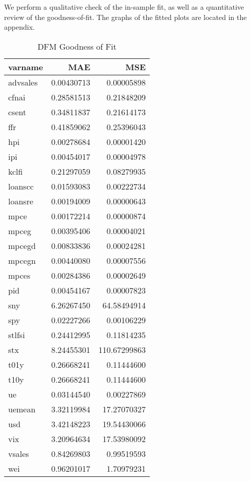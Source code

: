 \documentclass[11pt, letterpaper]{article}\usepackage[]{graphicx}\usepackage[]{color}
\begin{document}
We perform a qualitative check of the in-sample fit, as well as a quantitative review of the goodness-of-fit. The graphs of the fitted plots are located in the appendix.
\begin{table}[H]
\centering
\begingroup\footnotesize
\begin{tabular}{lrr}
  \hline
varname & MAE & MSE \\ 
  \hline
advsales & 0.00430713 & 0.00005898 \\ 
  cfnai & 0.28581513 & 0.21848209 \\ 
  csent & 0.34811837 & 0.21614173 \\ 
  ffr & 0.41859062 & 0.25396043 \\ 
  hpi & 0.00278684 & 0.00001420 \\ 
  ipi & 0.00454017 & 0.00004978 \\ 
  kclfi & 0.21297059 & 0.08279935 \\ 
  loanscc & 0.01593083 & 0.00222734 \\ 
  loansre & 0.00194009 & 0.00000643 \\ 
  mpce & 0.00172214 & 0.00000874 \\ 
  mpceg & 0.00395406 & 0.00004021 \\ 
  mpcegd & 0.00833836 & 0.00024281 \\ 
  mpcegn & 0.00440080 & 0.00007556 \\ 
  mpces & 0.00284386 & 0.00002649 \\ 
  pid & 0.00454167 & 0.00007823 \\ 
  sny & 6.26267450 & 64.58494914 \\ 
  spy & 0.02227266 & 0.00106229 \\ 
  stlfsi & 0.24412995 & 0.11814235 \\ 
  stx & 8.24455301 & 110.67299863 \\ 
  t01y & 0.26668241 & 0.11444600 \\ 
  t10y & 0.26668241 & 0.11444600 \\ 
  ue & 0.03144540 & 0.00227869 \\ 
  uemean & 3.32119984 & 17.27070327 \\ 
  usd & 3.42148223 & 19.54430066 \\ 
  vix & 3.20964634 & 17.53980092 \\ 
  vsales & 0.84269803 & 0.99519593 \\ 
  wei & 0.96201017 & 1.70979231 \\ 
   \hline
\end{tabular}
\endgroup
\caption{DFM Goodness of Fit} 
\end{table}
\end{document}
